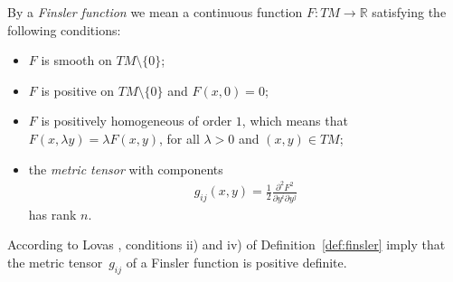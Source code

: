 \documentclass[11pt]{article}
\numberwithin{equation}{section}
\begin{document}
\begin{Definition} \label{def:finsler}
By a \emph{Finsler function} we mean a continuous function $F: TM
\to \mathbb{R}$ satisfying the following conditions:
\begin{itemize}\itemsep=0pt
\item[i)] $F$ is smooth on $TM\setminus\{0\}$;
\item[ii)] $F$ is positive on $TM\setminus\{0\}$ and $F(x,0)=0$;
\item[iii)] $F$ is positively homogeneous of order $1$, which
means that $F(x,\lambda y)=\lambda F(x,y)$, for all $\lambda>0$
and $(x,y)\in TM$;
\item[iv)] the \emph{metric tensor} with components
\begin{gather*}
g_{ij}(x,y)=\frac{1}{2}\frac{\partial^2 F^2}{\partial y^i\partial
y^j} %
\end{gather*}
has rank $n$. \end{itemize}
\end{Definition}
According to Lovas \cite{lovas07}, conditions ii) and iv) of
Def\/inition~\ref{def:finsler}  imply that the metric tensor~$g_{ij}$ of
a Finsler function is positive def\/inite.
\end{document}
